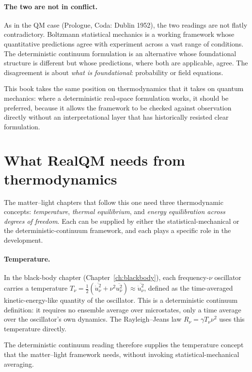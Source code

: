 \paragraph{The two are not in conflict.}
As in the QM case (Prologue, Coda: Dublin 1952), the two readings are not flatly contradictory. Boltzmann statistical mechanics is a working framework whose quantitative predictions agree with experiment across a vast range of conditions. The deterministic continuum formulation is an alternative whose foundational structure is different but whose predictions, where both are applicable, agree. The disagreement is about \emph{what is foundational}: probability or field equations.

This book takes the same position on thermodynamics that it takes on quantum mechanics: where a deterministic real-space formulation works, it should be preferred, because it allows the framework to be checked against observation directly without an interpretational layer that has historically resisted clear formulation.

\section{What RealQM needs from thermodynamics}\label{sec:realqm-needs}

The matter--light chapters that follow this one need three thermodynamic concepts: \emph{temperature}, \emph{thermal equilibrium}, and \emph{energy equilibration across degrees of freedom}. Each can be supplied by either the statistical-mechanical or the deterministic-continuum framework, and each plays a specific role in the development.

\paragraph{Temperature.}
In the black-body chapter (Chapter~\ref{ch:blackbody}), each frequency-$\nu$ oscillator carries a temperature $T_\nu = \tfrac{1}{2}(\overline{\dot u_\nu^2} + \nu^2 \overline{u_\nu^2}) \approx \overline{\dot u_\nu^2}$, defined as the time-averaged kinetic-energy-like quantity of the oscillator. This is a deterministic continuum definition: it requires no ensemble average over microstates, only a time average over the oscillator's own dynamics. The Rayleigh--Jeans law $R_\nu = \gamma T_\nu \nu^2$ uses this temperature directly.

The deterministic continuum reading therefore supplies the temperature concept that the matter--light framework needs, without invoking statistical-mechanical averaging.

